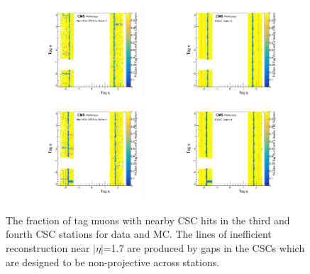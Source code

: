 \begin{figure}[htbp]
    \includegraphics[width=0.45\textwidth]{figures/cscNearbyFracData_station2.pdf}
    \hspace{0.01\textwidth}
    \centering
    \includegraphics[width=0.45\textwidth]{figures/cscNearbyFracMC_station2.pdf}
    \includegraphics[width=0.45\textwidth]{figures/cscNearbyFracData_station3.pdf}
    \hspace{0.01\textwidth}
    \includegraphics[width=0.45\textwidth]{figures/cscNearbyFracMC_station3.pdf}
    \caption[CSC segment efficiencies for stations three and four]{The fraction of tag muons with nearby CSC hits in the third and fourth CSC stations for data and MC. The lines of inefficient reconstruction near $|\eta|$=1.7 are produced by gaps in the CSCs which are designed to be non-projective across stations.}
    \label{fig:CSCeff2}
\end{figure}

